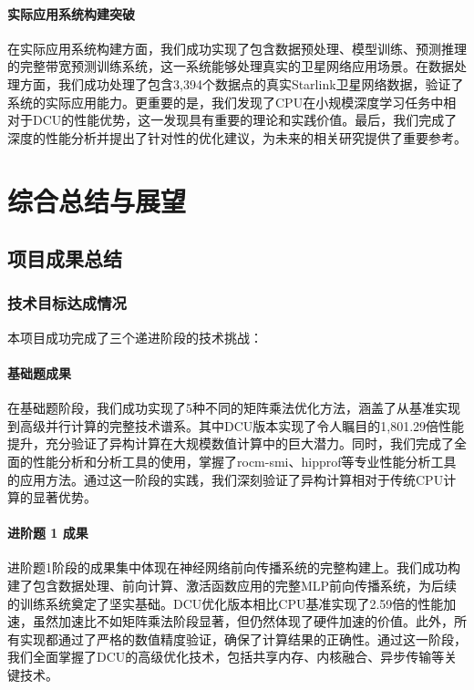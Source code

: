 \documentclass[a4paper]{article}
\begin{document}
\paragraph{实际应用系统构建突破}

在实际应用系统构建方面，我们成功实现了包含数据预处理、模型训练、预测推理的完整带宽预测训练系统，这一系统能够处理真实的卫星网络应用场景。在数据处理方面，我们成功处理了包含3,394个数据点的真实Starlink卫星网络数据，验证了系统的实际应用能力。更重要的是，我们发现了CPU在小规模深度学习任务中相对于DCU的性能优势，这一发现具有重要的理论和实践价值。最后，我们完成了深度的性能分析并提出了针对性的优化建议，为未来的相关研究提供了重要参考。

\section{综合总结与展望}

\subsection{项目成果总结}

\subsubsection{技术目标达成情况}

本项目成功完成了三个递进阶段的技术挑战：

\paragraph{基础题成果}

在基础题阶段，我们成功实现了5种不同的矩阵乘法优化方法，涵盖了从基准实现到高级并行计算的完整技术谱系。其中DCU版本实现了令人瞩目的1,801.29倍性能提升，充分验证了异构计算在大规模数值计算中的巨大潜力。同时，我们完成了全面的性能分析和分析工具的使用，掌握了rocm-smi、hipprof等专业性能分析工具的应用方法。通过这一阶段的实践，我们深刻验证了异构计算相对于传统CPU计算的显著优势。

\paragraph{进阶题 1 成果}

进阶题1阶段的成果集中体现在神经网络前向传播系统的完整构建上。我们成功构建了包含数据处理、前向计算、激活函数应用的完整MLP前向传播系统，为后续的训练系统奠定了坚实基础。DCU优化版本相比CPU基准实现了2.59倍的性能加速，虽然加速比不如矩阵乘法阶段显著，但仍然体现了硬件加速的价值。此外，所有实现都通过了严格的数值精度验证，确保了计算结果的正确性。通过这一阶段，我们全面掌握了DCU的高级优化技术，包括共享内存、内核融合、异步传输等关键技术。
\end{document}
